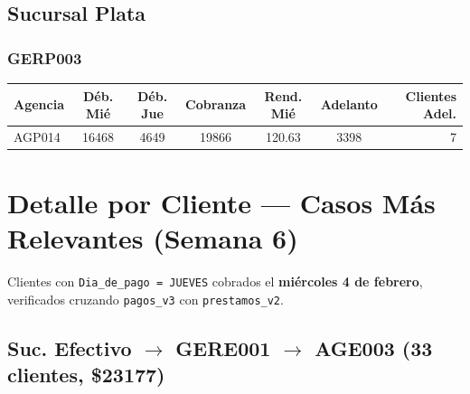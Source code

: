 \documentclass[11pt,a4paper]{article}
\newcommand{\money}[1]{\$\num{#1}}
\begin{document}
\subsection{Sucursal Plata}

\subsubsection{GERP003}

\begin{center}
\renewcommand{\arraystretch}{1.2}
\footnotesize
\begin{tabular}{lS[table-format=5.0]S[table-format=5.0]S[table-format=5.0]S[table-format=3.2]S[table-format=5.0]r}
\toprule
\textbf{Agencia}
  & {\textbf{D\'eb. Mi\'e}} & {\textbf{D\'eb. Jue}} & {\textbf{Cobranza}}
  & {\textbf{Rend. Mi\'e}} & {\textbf{Adelanto}} & \textbf{Clientes Adel.} \\
\midrule
AGP014 & 16468 & 4649 & 19866 & 120.63 & 3398 & 7 \\
\bottomrule
\end{tabular}
\end{center}

\section{Detalle por Cliente --- Casos M\'as Relevantes (Semana 6)}

Clientes con \texttt{Dia\_de\_pago = JUEVES} cobrados el \textbf{mi\'ercoles 4 de febrero},
verificados cruzando \texttt{pagos\_v3} con \texttt{prestamos\_v2}.

\subsection{Suc. Efectivo $\rightarrow$ GERE001 $\rightarrow$ AGE003 (33 clientes, \money{23177})}
\end{document}
